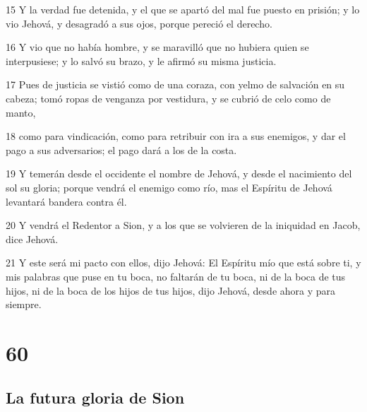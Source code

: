 \par 15 Y la verdad fue detenida, y el que se apartó del mal fue puesto en prisión; y lo vio Jehová, y desagradó a sus ojos, porque pereció el derecho.
\par 16 Y vio que no había hombre, y se maravilló que no hubiera quien se interpusiese; y lo salvó su brazo, y le afirmó su misma justicia. 
\par 17 Pues de justicia se vistió como de una coraza, con yelmo de salvación en su cabeza; tomó ropas de venganza por vestidura, y se cubrió de celo como de manto,
\par 18 como para vindicación, como para retribuir con ira a sus enemigos, y dar el pago a sus adversarios; el pago dará a los de la costa.
\par 19 Y temerán desde el occidente el nombre de Jehová, y desde el nacimiento del sol su gloria; porque vendrá el enemigo como río, mas el Espíritu de Jehová levantará bandera contra él.
\par 20 Y vendrá el Redentor a Sion, y a los que se volvieren de la iniquidad en Jacob, dice Jehová.
\par 21 Y este será mi pacto con ellos, dijo Jehová: El Espíritu mío que está sobre ti, y mis palabras que puse en tu boca, no faltarán de tu boca, ni de la boca de tus hijos, ni de la boca de los hijos de tus hijos, dijo Jehová, desde ahora y para siempre.

\chapter{60}

\section*{La futura gloria de Sion}

